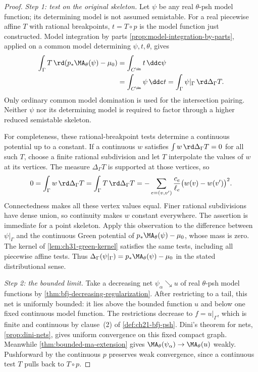 \begin{proof}
\emph{Step 1: test on the original skeleton.}
Let \(\psi\) be any real \(\theta\)-psh model function; its determining
model is not assumed semistable.  For a real piecewise affine \(T\)
with rational breakpoints, \(t=T\circ p\) is the model function just
constructed.  Model integration by parts
\cref{prop:model-integration-by-parts}, applied on a common model
determining \(\psi,t,\theta\), gives
\begin{equation}
\label{eq:ch25-weighted-skeletal-test}
 \begin{aligned}
 \int_\Gamma T\,\rd(p_*\MA_\theta(\psi)-\mu_0)
 &=\int_{C^{\An}}t\,\ddc\psi\\
 &=\int_{C^{\An}}\psi\,\ddc t
 =\int_\Gamma\psi|_\Gamma\,\rd\Delta_\Gamma T.
 \end{aligned}
\end{equation}
Only ordinary common model domination is used for the intersection
pairing.  Neither \(\psi\) nor its determining model is required to
factor through a higher reduced semistable skeleton.

For completeness, these rational-breakpoint tests determine a
continuous potential up to a constant.  If a continuous \(w\) satisfies
\(\int w\,\rd\Delta_\Gamma T=0\) for all such \(T\), choose a finite
rational subdivision and let \(T\) interpolate the values of \(w\) at
its vertices.  The measure \(\Delta_\Gamma T\) is supported at those
vertices, so
\[
 0=\int_\Gamma w\,\rd\Delta_\Gamma T
   =\int_\Gamma T\,\rd\Delta_\Gamma T
   =-\sum_{e=(v,v')}\frac{c_e}{\ell_e}
                         \bigl(w(v)-w(v')\bigr)^2.
\]
Connectedness makes all these vertex values equal.  Finer rational
subdivisions have dense union, so continuity makes \(w\) constant
everywhere.  The assertion is immediate for a point skeleton.
Apply this observation to the difference between \(\psi|_\Gamma\)
and the continuous Green potential of
\(p_*\MA_\theta(\psi)-\mu_0\), whose mass is zero.  The kernel of
\cref{lem:ch31-green-kernel} satisfies the same tests, including all
piecewise affine tests.  Thus
\(\Delta_\Gamma(\psi|_\Gamma)=p_*\MA_\theta(\psi)-\mu_0\) in the
stated distributional sense.

\emph{Step 2: the bounded limit.}
Take a decreasing net \(\psi_\alpha\searrow u\) of real
\(\theta\)-psh model functions by
\cref{thm:bfj-decreasing-regularization}.  After restricting to a
tail, this net is uniformly bounded: it lies above the bounded
function \(u\) and below one fixed continuous model function.
The restrictions decrease to \(f=u|_\Gamma\), which is finite and
continuous by clause~(2) of \cref{def:ch21-bfj-psh}.
Dini's theorem for nets, \cref{prop:dini-nets}, gives uniform
convergence on this fixed compact graph.  Meanwhile
\cref{thm:bounded-ma-extension} gives
\(\MA_\theta(\psi_\alpha)\to\MA_\theta(u)\) weakly.
Pushforward by the continuous \(p\) preserves weak convergence,
since a continuous test \(T\) pulls back to \(T\circ p\).


\end{proof}
